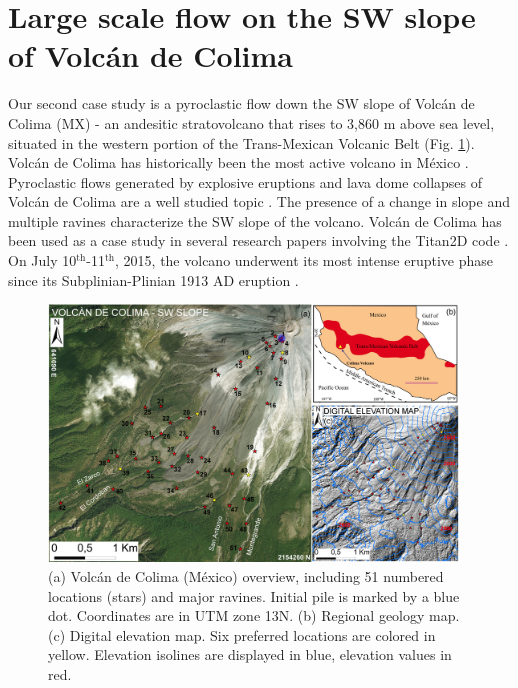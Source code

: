 \documentclass{article}
\begin{document}
\section{Large scale flow on the SW slope of Volc{\'a}n de Colima}\label{QoI2}
Our second case study is a pyroclastic flow down the SW slope of Volc{\'a}n de Colima (MX) - an andesitic stratovolcano that rises to 3,860 m above sea level, situated in the western portion of the Trans-Mexican Volcanic Belt (Fig. \ref{fig:Colima-first}). Volc{\'a}n de Colima has historically been the most active volcano in M{\'e}xico \citep{DeLaCruzReina1993, Zobin2002, Gonzalez2002}. Pyroclastic flows generated by explosive eruptions and lava dome collapses of Volc{\'a}n de Colima are a well studied topic \citep{DelPozzo1995,Sheridan1995,Saucedo2002,Saucedo2004,Saucedo2005,Sarocchi2011,Capra2015}. The presence of a change in slope and multiple ravines characterize the SW slope of the volcano. Volc{\'a}n de Colima has been used as a case study in several research papers involving the Titan2D code \citep{Rupp2004, Rupp2006, Dalbey2008, Yu2009, Sulpizio2010, Capra2011, Aghakhani2016}. On July 10$^{\mathrm{th}}$-11$^{\mathrm{th}}$, 2015, the volcano underwent its most intense eruptive phase since its Subplinian-Plinian 1913 AD eruption \citep{Saucedo2010, Zobin2015, ReyesDaVilla2016, Capra2016, Macorps2018}.
\begin{figure}[H]
    \includegraphics[width=0.97\textwidth]{figures/Colima/ColimaFig.jpg}
    \centering
    \caption{(a) Volc{\'a}n de Colima (M{\'e}xico) overview, including 51 numbered locations (stars) and major ravines. Initial pile is marked by a blue dot. Coordinates are in UTM zone 13N. (b) Regional geology map. (c) Digital elevation map. Six preferred locations are colored in yellow. Elevation isolines are displayed in blue, elevation values in red.}
    \label{fig:Colima-first}
\end{figure}
\end{document}
